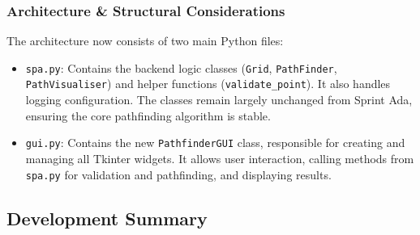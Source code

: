 \subsubsection{Architecture \& Structural Considerations}

The architecture now consists of two main Python files:
\begin{itemize}
	\item \verb|spa.py|: Contains the backend logic classes (\verb|Grid|, \verb|PathFinder|, \verb|PathVisualiser|) and helper functions (\verb|validate_point|). It also handles logging configuration. The classes remain largely unchanged from Sprint Ada, ensuring the core pathfinding algorithm is stable.
	\item \verb|gui.py|: Contains the new \verb|PathfinderGUI| class, responsible for creating and managing all Tkinter widgets. It allows user interaction, calling methods from \verb|spa.py| for validation and pathfinding, and displaying results.
\end{itemize}

\newpage

\subsection{Development Summary}



